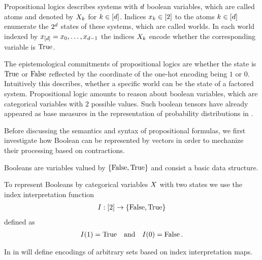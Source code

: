 \chapter{\chatextlogicalRepresentation}\label{cha:logicalRepresentation}

Propositional logics describes systems with $d$ boolean variables, which are called atoms and denoted by $X_{k}$ for $k\in[d]$.
Indices $x_{k}\in[2]$ to the atoms $k\in[d]$ enumerate the $2^d$ states of these systems, which are called worlds.
In each world indexed by $x_{[d]}=x_{0},\ldots,x_{d-1}$ the indices $X_{k}$ encode whether the corresponding variable is $\mathrm{True}$. 

The epistemological commitments of propositional logics are whether the state is $\mathrm{True}$ or $\mathrm{False}$ reflected by the coordinate of the one-hot encoding being $1$ or $0$.
Intuitively this describes, whether a specific world can be the state of a factored system.
Propositional logic amounts to reason about boolean variables, which are categorical variables with $2$ possible values.
Such boolean tensors have already appeared as base measures in the representation of probability distributions in .

Before discussing the semantics and syntax of propositional formulas, we first investigate how Boolean can be represented by vectors in order to mechanize their processing based on contractions.



\label{sec:booleanEncoding}

Booleans are variables valued by $\{\mathrm{False},\mathrm{True}\}$ and consist a basic data structure.


To represent Booleans by categorical variables $X$ with two states we use the index interpretation function
\begin{align*}
	\indexinterpretation:[2]\rightarrow\truthset%
\end{align*}
defined as
\begin{align*}
	\indexinterpretationat{1} = \truesymbol%
	\quad \text{and} \quad \indexinterpretationat{0} = \falsesymbol \, .
\end{align*}

In  in  will define encodings of arbitrary sets based on index interpretation maps.

